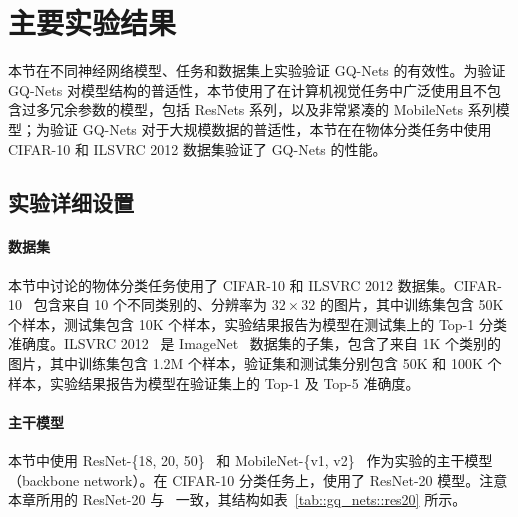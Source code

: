 \section{主要实验结果} \label{sec::gq_nets::exp}
本节在不同神经网络模型、任务和数据集上实验验证 GQ-Nets 的有效性。为验证 GQ-Nets 对模型结构的普适性，本节使用了在计算机视觉任务中广泛使用且不包含过多冗余参数的模型，包括 ResNets 系列，以及非常紧凑的 MobileNets 系列模型；为验证 GQ-Nets 对于大规模数据的普适性，本节在在物体分类任务中使用 CIFAR-10 和 ILSVRC 2012 数据集验证了 GQ-Nets 的性能。
\subsection{实验详细设置} \label{sec::gq_nets::general_conf}
\paragraph{数据集}
本节中讨论的物体分类任务使用了 CIFAR-10 和 ILSVRC 2012 数据集。CIFAR-10~\citep{krizhevsky2009learning} 包含来自 10 个不同类别的、分辨率为 $32 \times 32$ 的图片，其中训练集包含 50K 个样本，测试集包含 10K 个样本，实验结果报告为模型在测试集上的 Top-1 分类准确度。ILSVRC 2012~\citep{ILSVRC15} 是 ImageNet~\citep{deng2009imagenet} 数据集的子集，包含了来自 1K 个类别的图片，其中训练集包含 1.2M 个样本，验证集和测试集分别包含 50K 和 100K 个样本，实验结果报告为模型在验证集上的 Top-1 及 Top-5 准确度。


\paragraph{主干模型}
本节中使用 ResNet-\{18, 20, 50\}~\citep{He_2016} 和 MobileNet-\{v1, v2\}~\citep{howard2017mobilenets, Sandler_2018} 作为实验的主干模型（backbone network）。在 CIFAR-10 分类任务上，使用了 ResNet-20 模型。注意本章所用的 ResNet-20 与~\citet{zhou2016dorefanet, choi2018pact, li2019additive} 一致，其结构如表~\ref{tab::gq_nets::res20} 所示。

